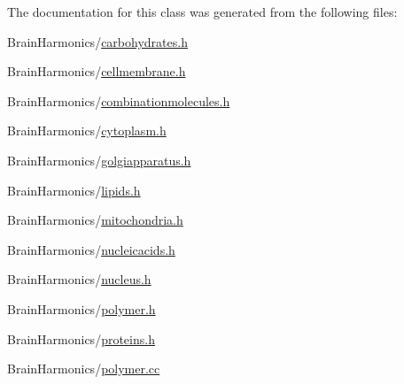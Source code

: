 The documentation for this class was generated from the following files\+:\begin{DoxyCompactItemize}
\item 
Brain\+Harmonics/\hyperlink{carbohydrates_8h}{carbohydrates.\+h}\item 
Brain\+Harmonics/\hyperlink{cellmembrane_8h}{cellmembrane.\+h}\item 
Brain\+Harmonics/\hyperlink{combinationmolecules_8h}{combinationmolecules.\+h}\item 
Brain\+Harmonics/\hyperlink{cytoplasm_8h}{cytoplasm.\+h}\item 
Brain\+Harmonics/\hyperlink{golgiapparatus_8h}{golgiapparatus.\+h}\item 
Brain\+Harmonics/\hyperlink{lipids_8h}{lipids.\+h}\item 
Brain\+Harmonics/\hyperlink{mitochondria_8h}{mitochondria.\+h}\item 
Brain\+Harmonics/\hyperlink{nucleicacids_8h}{nucleicacids.\+h}\item 
Brain\+Harmonics/\hyperlink{nucleus_8h}{nucleus.\+h}\item 
Brain\+Harmonics/\hyperlink{polymer_8h}{polymer.\+h}\item 
Brain\+Harmonics/\hyperlink{proteins_8h}{proteins.\+h}\item 
Brain\+Harmonics/\hyperlink{polymer_8cc}{polymer.\+cc}\end{DoxyCompactItemize}
